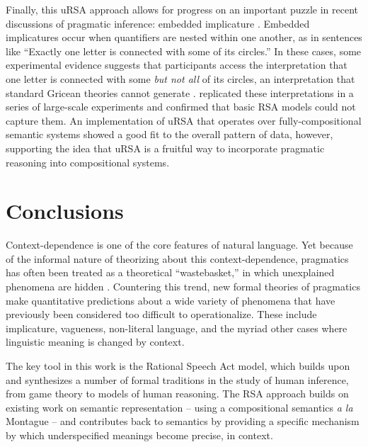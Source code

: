 \documentclass[]{elsarticle}
\begin{document}
Finally, this uRSA approach allows for progress on an important puzzle
in recent discussions of pragmatic inference: embedded implicature \citep{geurts2009,chemla2011}. Embedded
implicatures occur when quantifiers are nested within one another, as in
sentences like ``Exactly one letter is connected with some of its
circles.'' In these cases, some experimental evidence suggests that
participants access the interpretation that one letter is connected with
some \emph{but not all} of its circles, an interpretation that standard
Gricean theories cannot generate \citep{chemla2011}. \citet{potts2015} replicated these interpretations in a series of large-scale
experiments and confirmed that basic RSA models could not capture them.
An implementation of uRSA that operates over fully-compositional
semantic systems \citep{bergen2016,potts2015} showed a good fit to the overall pattern of data, however, supporting the idea that uRSA is a fruitful way to incorporate pragmatic reasoning into compositional systems.

\section{Conclusions}\label{conclusions-and-future-directions}

Context-dependence is one of the core features of natural language. Yet
because of the informal nature of theorizing about this context-dependence,
pragmatics has often been treated as a theoretical ``wastebasket,'' in
which unexplained phenomena are hidden \citep{bar-hillel1971}. Countering this trend, new formal theories of pragmatics make quantitative
predictions about a wide variety of phenomena that have previously been
considered too difficult to operationalize. These include implicature,
vagueness, non-literal language, and the myriad other cases where
linguistic meaning is changed by context.

The key tool in this work is the Rational Speech Act model, which builds upon and synthesizes a
number of formal traditions in the study of human inference, from game
theory to models of human reasoning. The RSA approach builds on existing
work on semantic representation -- using a compositional semantics
\emph{a la} Montague \citep{dowty2012} -- and contributes back to semantics by providing a
specific mechanism by which underspecified meanings become precise, in
context.

\end{document}
